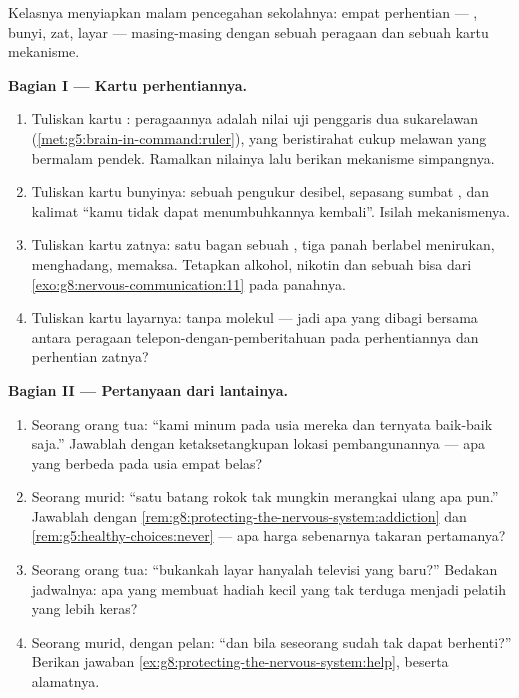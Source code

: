 \begin{problem}\label{pb:g8:protecting-the-nervous-system:1}
Kelasnya menyiapkan malam pencegahan sekolahnya: empat
perhentian --- , bunyi, zat, layar --- masing-masing
dengan sebuah peragaan dan sebuah kartu mekanisme.

\medskip\noindent\textbf{Bagian I --- Kartu
perhentiannya.}
\begin{enumerate}
  \item Tuliskan kartu : peragaannya adalah nilai
        uji penggaris dua sukarelawan
        (\cref{met:g5:brain-in-command:ruler}), yang
        beristirahat cukup melawan yang bermalam pendek.
        Ramalkan nilainya lalu berikan mekanisme simpangnya.
  \item Tuliskan kartu bunyinya: sebuah pengukur desibel,
        sepasang sumbat , dan kalimat ``kamu tidak
        dapat menumbuhkannya kembali''. Isilah mekanismenya.
  \item Tuliskan kartu zatnya: satu bagan sebuah ,
        tiga panah berlabel menirukan, menghadang, memaksa.
        Tetapkan alkohol, nikotin dan sebuah bisa dari
        \cref{exo:g8:nervous-communication:11} pada panahnya.
  \item Tuliskan kartu layarnya: tanpa molekul --- jadi apa
        yang dibagi bersama antara peragaan
        telepon-dengan-pemberitahuan pada perhentiannya dan
        perhentian zatnya?
\end{enumerate}

\medskip\noindent\textbf{Bagian II --- Pertanyaan dari
lantainya.}
\begin{enumerate}[resume]
  \item Seorang orang tua: ``kami minum pada usia mereka dan
        ternyata baik-baik saja.'' Jawablah dengan
        ketaksetangkupan lokasi pembangunannya --- apa yang
        berbeda pada usia empat belas?
  \item Seorang murid: ``satu batang rokok tak mungkin
        merangkai ulang apa pun.'' Jawablah dengan
        \cref{rem:g8:protecting-the-nervous-system:addiction}
        dan \cref{rem:g5:healthy-choices:never} --- apa harga
        sebenarnya takaran pertamanya?
  \item Seorang orang tua: ``bukankah layar hanyalah
        televisi yang baru?'' Bedakan jadwalnya: apa yang
        membuat hadiah kecil yang tak terduga menjadi
        pelatih yang lebih keras?
  \item Seorang murid, dengan pelan: ``dan bila seseorang
        sudah tak dapat berhenti?'' Berikan jawaban
        \cref{ex:g8:protecting-the-nervous-system:help},
        beserta alamatnya.
\end{enumerate}


\end{problem}
